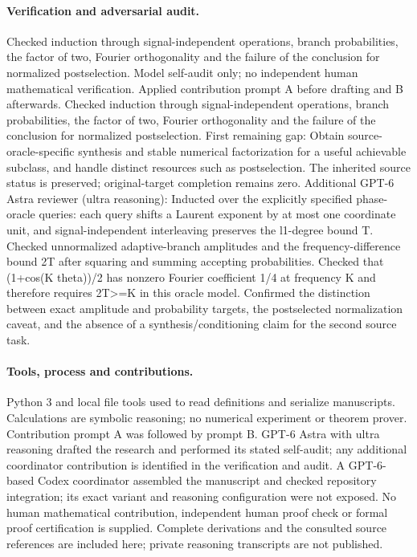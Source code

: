 \documentclass[11pt]{article}
\begin{document}
\paragraph{Verification and adversarial audit.}
Checked induction through signal-independent operations, branch probabilities, the factor of two, Fourier orthogonality and the failure of the conclusion for normalized postselection. Model self-audit only; no independent human mathematical verification. Applied contribution prompt A before drafting and B afterwards. Checked induction through signal-independent operations, branch probabilities, the factor of two, Fourier orthogonality and the failure of the conclusion for normalized postselection. First remaining gap: Obtain source-oracle-specific synthesis and stable numerical factorization for a useful achievable subclass, and handle distinct resources such as postselection. The inherited source status is preserved; original-target completion remains zero. Additional GPT-6 Astra reviewer (ultra reasoning): Inducted over the explicitly specified phase-oracle queries: each query shifts a Laurent exponent by at most one coordinate unit, and signal-independent interleaving preserves the l1-degree bound T. Checked unnormalized adaptive-branch amplitudes and the frequency-difference bound 2T after squaring and summing accepting probabilities. Checked that (1+cos(K theta))/2 has nonzero Fourier coefficient 1/4 at frequency K and therefore requires 2T>=K in this oracle model. Confirmed the distinction between exact amplitude and probability targets, the postselected normalization caveat, and the absence of a synthesis/conditioning claim for the second source task.

\paragraph{Tools, process and contributions.}
Python 3 and local file tools used to read definitions and serialize manuscripts. Calculations are symbolic reasoning; no numerical experiment or theorem prover. Contribution prompt A was followed by prompt B. GPT-6 Astra with ultra reasoning drafted the research and performed its stated self-audit; any additional coordinator contribution is identified in the verification and audit. A GPT-6-based Codex coordinator assembled the manuscript and checked repository integration; its exact variant and reasoning configuration were not exposed. No human mathematical contribution, independent human proof check or formal proof certification is supplied. Complete derivations and the consulted source references are included here; private reasoning transcripts are not published.
\end{document}
